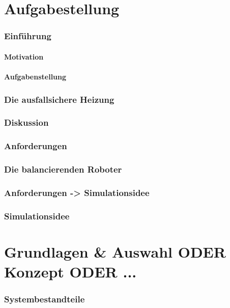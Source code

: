 \documentclass[ngerman]{scrartcl}
\begin{document}
\tableofcontents

\clearpage



\part{Aufgabestellung}
\section{Einf{\"{u}}hrung}
\subsection{Motivation}
\subsection{Aufgabenstellung} 
\section{Die ausfallsichere Heizung}\label{heizung}
\section{Diskussion}
\section{Anforderungen}\label{anforderung}
\section{Die balancierenden Roboter}
\section{Anforderungen -> Simulationsidee}
\section{Simulationsidee}

\part{Grundlagen \& Auswahl ODER Konzept ODER ...}
\section{Systembestandteile}
\end{document}
